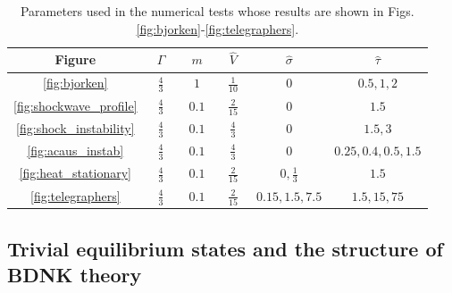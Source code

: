 \documentclass[%
notitlepage,
superscriptaddress,
nofootinbib,
amsmath,
amssymb,
aps,
twocolumn
]{revtex4-1}
\begin{document}
\begin{table}[h]
\renewcommand{\arraystretch}{1.2}
\begin{tabular}{c || c | c | c | c | c}
Figure                      & ~$\Gamma$~ & ~$m$~ & ~$\hat{V}$~ & ~$\hat{\sigma}$~ & $\hat{\tau}$ \\ \hline \hline
\ref{fig:bjorken}           & $\frac{4}{3}$ & $1$   & $\frac{1}{10}$ & $0$ & $0.5, 1, 2$ \\ 
\ref{fig:shockwave_profile} & $\frac{4}{3}$ & $0.1$ & $\frac{2}{15}$ & $0$ & $1.5$ \\
\ref{fig:shock_instability} & $\frac{4}{3}$ & $0.1$ & $\frac{4}{3}$ & $0$ & $1.5, 3$ \\
\ref{fig:acaus_instab}      & $\frac{4}{3}$ & $0.1$ & $\frac{4}{3}$ & $0$ & $0.25, 0.4, 0.5, 1.5$ \\
\ref{fig:heat_stationary}   & $\frac{4}{3}$ & $0.1$ & $\frac{2}{15}$ & $0, \frac{1}{3}$ & $1.5$ \\
\ref{fig:telegraphers}      & $\frac{4}{3}$ & $0.1$ & $\frac{2}{15}$ & $0.15, 1.5, 7.5$ & $1.5, 15, 75$ \\
\end{tabular}
\caption{Parameters used in the numerical tests whose results are shown in Figs. \ref{fig:bjorken}-\ref{fig:telegraphers}.} \label{table:parameters}
\end{table}

\subsection{Trivial equilibrium states and the structure of BDNK theory} \label{sec:eq_states}
\end{document}
